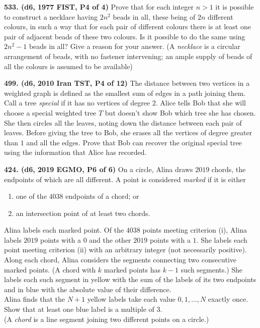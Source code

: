 \documentclass{article}
\begin{document}
        \textbf{533. (\color{red}d6\color{black}, 1977 FIST, P4 of 4)} Prove that for each integer $n > 1$ it is possible to construct a necklace having $2n^2$ beads in all, these being of $2n$ different colours, in such a way that for each pair of different colours there is at least one pair of adjacent beads of these two colours. Is it possible to do the same using $2n^2 -1$ beads in all? Give a reason for your answer. (A \emph{necklace} is a circular arrangement of beads, with no fastener intervening; an ample supply of beads of all the colours is assumed to be available)

        \textbf{499. (\color{red}d6\color{black}, 2010 Iran TST, P4 of 12)} The distance between two vertices in a weighted graph is defined as the smallest sum of edges in a path joining them. Call a tree \textit{special} if it has no vertices of degree $2.$ Alice tells Bob that she will choose a special weighted tree $T$ but doesn't show Bob which tree she has chosen. She then circles all the leaves, noting down the distance between each pair of leaves. Before giving the tree to Bob, she erases all the vertices of degree greater than $1$ and all the edges. Prove that Bob can recover the original special tree using the information that Alice has recorded.

        \textbf{424. (\color{red}d6\color{black}, 2019 EGMO, P6 of 6)} On a circle, Alina draws $2019$ chords, the endpoints of which are all different. A point is considered \emph{marked} if it is either
        \renewcommand{\labelenumi}{\theenumi}
        \renewcommand{\theenumi}{(\roman{enumi})}
        \begin{enumerate}
                \item one of the $4038$ endpoints of a chord; or
                \item an intersection point of at least two chords.
        \end{enumerate}
        Alina labels each marked point. Of the $4038$ points meeting criterion (i), Alina labels $2019$ points with a $0$ and the other $2019$ points with a $1$. She labels each point meeting criterion (ii) with an arbitrary integer (not necessarily positive).\\
        \hspace*{15pt} Along each chord, Alina considers the segments connecting two consecutive marked points. (A chord with $k$ marked points has $k-1$ such segments.) She labels each such segment in yellow with the sum of the labels of its two endpoints and in blue with the absolute value of their difference.\\
        \hspace*{15pt} Alina finds that the $N + 1$ yellow labels take each value $0, 1, . . . , N$ exactly once. Show that at least one blue label is a multiple of $3$.\\
        \hspace*{15pt} (A \emph{chord} is a line segment joining two different points on a circle.)
\end{document}
